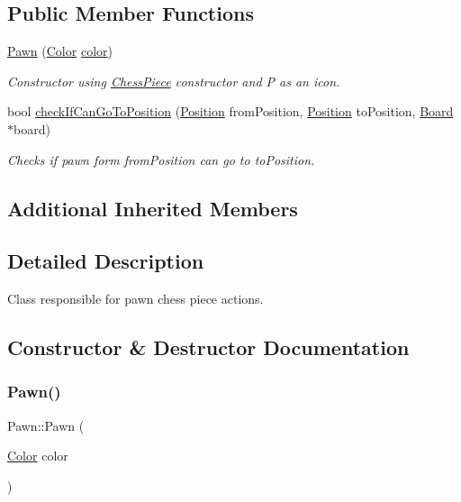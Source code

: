 \subsection*{Public Member Functions}
\begin{DoxyCompactItemize}
\item 
\hyperlink{classPawn_a3e1ac517cf828f52957f54179a455922}{Pawn} (\hyperlink{Enums_8h_ab87bacfdad76e61b9412d7124be44c1c}{Color} \hyperlink{classChessPiece_a8c8fc170e7c719ac2b71a93a56a38f01}{color})
\begin{DoxyCompactList}\small\item\em Constructor using \hyperlink{classChessPiece}{Chess\+Piece} constructor and \textquotesingle{}P\textquotesingle{} as an icon. \end{DoxyCompactList}\item 
bool \hyperlink{classPawn_a30abb1fc67dffcd5f9ae104baf3e27ac}{check\+If\+Can\+Go\+To\+Position} (\hyperlink{classPosition}{Position} from\+Position, \hyperlink{classPosition}{Position} to\+Position, \hyperlink{classBoard}{Board} $\ast$board)
\begin{DoxyCompactList}\small\item\em Checks if pawn form from\+Position can go to to\+Position. \end{DoxyCompactList}\end{DoxyCompactItemize}
\subsection*{Additional Inherited Members}


\subsection{Detailed Description}
Class responsible for pawn chess piece actions. 

\subsection{Constructor \& Destructor Documentation}
\mbox{\label{classPawn_a3e1ac517cf828f52957f54179a455922}} 
\subsubsection{\texorpdfstring{Pawn()}{Pawn()}}
{\footnotesize\ttfamily Pawn\+::\+Pawn (\begin{DoxyParamCaption}\item[{\hyperlink{Enums_8h_ab87bacfdad76e61b9412d7124be44c1c}{Color}}]{color }\end{DoxyParamCaption})\hspace{0.3cm}{\ttfamily [inline]}}



